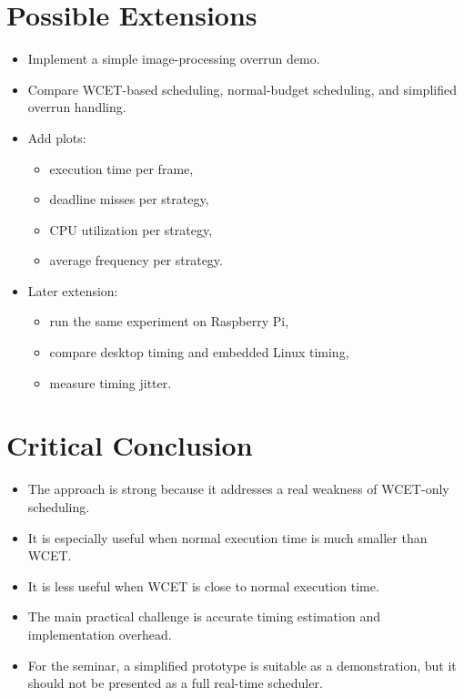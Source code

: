 \documentclass[a4paper,11pt]{article}
\begin{document}
\section*{Possible Extensions}

\begin{itemize}
    \item Implement a simple image-processing overrun demo.
    \item Compare WCET-based scheduling, normal-budget scheduling, and simplified overrun handling.
    \item Add plots:
    \begin{itemize}
        \item execution time per frame,
        \item deadline misses per strategy,
        \item CPU utilization per strategy,
        \item average frequency per strategy.
    \end{itemize}
    \item Later extension:
    \begin{itemize}
        \item run the same experiment on Raspberry Pi,
        \item compare desktop timing and embedded Linux timing,
        \item measure timing jitter.
    \end{itemize}
\end{itemize}

\section*{Critical Conclusion}

\begin{itemize}
    \item The approach is strong because it addresses a real weakness of WCET-only scheduling.
    \item It is especially useful when normal execution time is much smaller than WCET.
    \item It is less useful when WCET is close to normal execution time.
    \item The main practical challenge is accurate timing estimation and implementation overhead.
    \item For the seminar, a simplified prototype is suitable as a demonstration, but it should not be presented as a full real-time scheduler.
\end{itemize}
\end{document}
